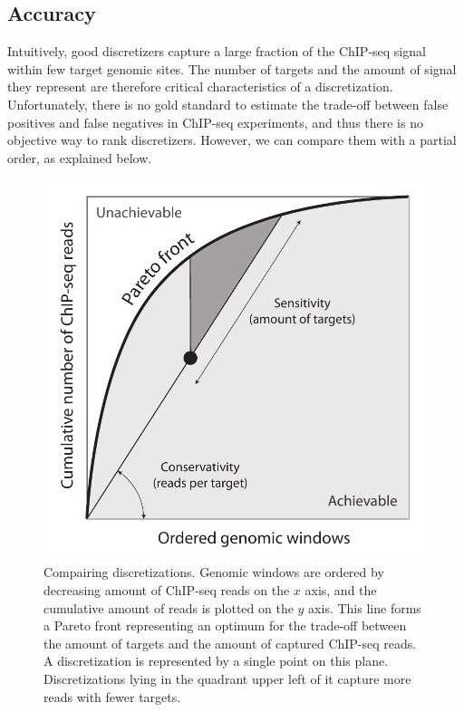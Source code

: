 \documentclass{bioinfo}
\begin{document}
\subsection{Accuracy}
Intuitively, good discretizers capture a large fraction of the
ChIP-seq signal within few target genomic sites. The number of targets
and the amount of signal they represent are therefore critical
characteristics of a discretization. Unfortunately, there is no gold
standard to estimate the trade-off between false positives and false
negatives in ChIP-seq experiments, and thus there is no objective way
to rank discretizers. However, we can compare them with a partial order,
as explained below.

\begin{figure}[!tpb]
\centerline{\includegraphics[scale=0.5]{pareto_front_explanation.pdf}}
\caption{Compairing discretizations. Genomic windows are ordered by
decreasing amount of ChIP-seq reads on the $x$ axis, and the
cumulative amount of reads is plotted on the $y$ axis. This line forms
a Pareto front representing an optimum for the trade-off between
the amount of targets and the amount of captured ChIP-seq reads. A
discretization is represented by a single point on this plane.
Discretizations lying in the quadrant upper left of it capture more
reads with fewer targets.}
\label{fig:expl}
\end{figure}
\end{document}
